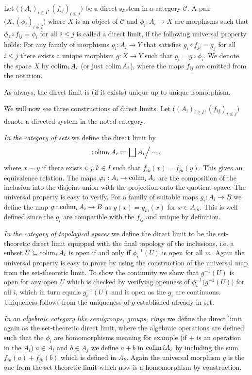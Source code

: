\begin{definition}
	Let $\big((A_i)_{i\in I},(f_{ij})_{i\leq j}\big)$ be a direct system in a category $\mathcal{C}$.  A pair $\big(X,(\phi_i)_{i\in I}\big)$ where $X$ is an object of $\mathcal{C}$ and $\phi_i:A_i \to X$ are morphisms such that $\phi_j\circ f_{ij}=\phi_i$ for all $i\leq j$ is called a direct limit, if the following universal property holds: 
	For any family of morphisms $g_i:A_i\to Y$ that satisfies $g_i\circ f_{ji}=g_j$ for all $i\leq j$ there exists a unique morphism $g:X\to Y$ such that $g_i=g\circ \phi_i$. We denote the space $X$ by $\operatorname{\mathrm{colim}}_{i}A_i$ (or just $\operatorname{\mathrm{colim}} A_i$), where the maps $f_{ij}$ are omitted from the notation.
\end{definition}
\begin{corollary}
	As always, the direct limit is (if it exists) unique up to unique isomorphism.
\end{corollary}
\begin{remark}
	We will now see three constructions of direct limits. Let $\big((A_i)_{i\in I},(f_{ij})_{i\leq j}\big)$ denote a directed system in the noted category. 

\textit{ In the category of sets} we define the direct limit by
\begin{equation*}
	\operatorname{\mathrm{colim}}_i A_i\coloneq \bigsqcup A_i \Big/ \sim  \,,
\end{equation*} where $x\sim y$ if there exists $i,j,k\in I$ such that $f_{ik}(x)=f_{jk}(y)$. This gives an equivalence relation. The maps $\varphi_i: A_i\to \operatorname{\mathrm{colim}}_{i}A_i$ are the composition of the inclusion into the disjoint union with the projection onto the quotient space. The universal property is easy to verify. For a family of suitable maps $g_i:A_i\to B$ we define the map $g:\operatorname{\mathrm{colim}}_{i}A_i\to B$ as $g(x)=g_m(x)$ for $x\in A_m$. This is well defined since the $g_i$ are compatible with the $f_{ij}$ and unique by definition.

\textit{ In the category of topological spaces} we define the direct limit to be the set-theoretic direct limit equipped with the final topology of the inclusions, i.e. a subset $U\subseteq \operatorname{\mathrm{colim}}_i A_i$ is open if and only if $\phi_i^{-1}(U)$ is open for all $m$. Again the universal property is easy to prove by using the construction of the universal map from the set-theoretic limit. To show the continuity we show that $g^{-1}(U)$ is open for any open $U$ which is checked by verifying openness of $\phi_i^{-1}\big(g^{-1}(U)\big)$ for all $i$, which in turn equals $g_i^{-1}(U)$ and is open as the $g_i$ are continuous. Uniqueness follows from the uniqueness of $g$ established already in set. 

\textit{ In an algebraic category like semigroups, groups, rings } we define the direct limit again as the set-theoretic direct limit, where the algebraic operations are defined such that the $\phi_i$ are homomorphisms meaning for example (if $+$ is an operation in the $A_i$) $a\in A_i$ and $b\in A_j$ we define $a+b$ in $\operatorname{\mathrm{colim}}{i}A_i$ by including the sum $f_{ik}(a)+f_{jk}(b)$ which is defined in $A_k$. Again the universal morphism $g$ is the one from the set-theoretic limit which now is a homomorphism by construction.	
\end{remark}
